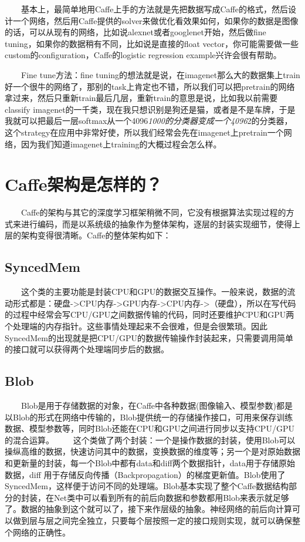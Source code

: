   基本上，最简单地用Caffe上手的方法就是先把数据写成Caffe的格式，然后设计一个网络，然后用Caffe提供的solver来做优化看效果如何，如果你的数据是图像的话，可以从现有的网络，比如说alexnet或者googlenet开始，然后做fine
tuning，如果你的数据稍有不同，比如说是直接的float
vector，你可能需要做一些custom的configuration，Caffe的logistic
regression example兴许会很有帮助。

  Fine tune方法：fine
tuning的想法就是说，在imagenet那么大的数据集上train好一个很牛的网络了，那别的task上肯定也不错，所以我们可以把pretrain的网络拿过来，然后只重新train最后几层，重新train的意思是说，比如我以前需要classify
imagenet的一千类，现在我只想识别是狗还是猫，或者是不是车牌，于是我就可以把最后一层softmax从一个4096\emph{1000的分类器变成一个4096}2的分类器，这个strategy在应用中非常好使，所以我们经常会先在imagenet上pretrain一个网络，因为我们知道imagenet上training的大概过程会怎么样。

\section{Caffe架构是怎样的？}\label{caffeux67b6ux6784ux662fux600eux6837ux7684}

  Caffe的架构与其它的深度学习框架稍微不同，它没有根据算法实现过程的方式来进行编码，而是以系统级的抽象作为整体架构，逐层的封装实现细节，使得上层的架构变得很清晰。Caffe的整体架构如下：

\subsection{ SyncedMem}\label{syncedmem}

  这个类的主要功能是封装CPU和GPU的数据交互操作。一般来说，数据的流动形式都是：硬盘-\textgreater{}CPU内存-\textgreater{}GPU内存-\textgreater{}CPU内存-\textgreater{}（硬盘），所以在写代码的过程中经常会写CPU/GPU之间数据传输的代码，同时还要维护CPU和GPU两个处理端的内存指针。这些事情处理起来不会很难，但是会很繁琐。因此SyncedMem的出现就是把CPU/GPU的数据传输操作封装起来，只需要调用简单的接口就可以获得两个处理端同步后的数据。

\subsection{ Blob}\label{blob}

  Blob是用于存储数据的对象，在Caffe中各种数据(图像输入、模型参数)都是以Blob的形式在网络中传输的，Blob提供统一的存储操作接口，可用来保存训练数据、模型参数等，同时Blob还能在CPU和GPU之间进行同步以支持CPU/GPU的混合运算。
  这个类做了两个封装：一个是操作数据的封装，使用Blob可以操纵高维的数据，快速访问其中的数据，变换数据的维度等；另一个是对原始数据和更新量的封装，每一个Blob中都有data和diff两个数据指针，data用于存储原始数据，diff
用于存储反向传播（Backpropagation）的梯度更新值。Blob使用了SyncedMem，这样便于访问不同的处理端。Blob基本实现了整个Caffe数据结构部分的封装，在Net类中可以看到所有的前后向数据和参数都用Blob来表示就足够了。数据的抽象到这个就可以了，接下来作层级的抽象。神经网络的前后向计算可以做到层与层之间完全独立，只要每个层按照一定的接口规则实现，就可以确保整个网络的正确性。

